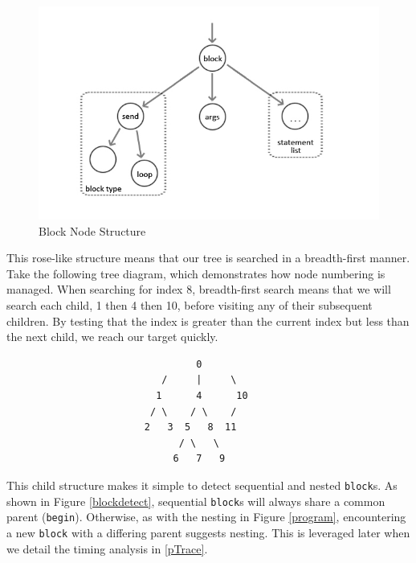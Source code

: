 \documentclass[11pt, abstracton, twoside, titlepage=true]{scrartcl}
\begin{document}
\begin{figure}[h!]
	\centering
	\includegraphics[width=\textwidth]{images/Block.jpg}
	\caption{Block Node Structure} \label{blocks}
\end{figure}

This rose-like structure means that our tree is searched in a breadth-first manner. 
Take the following tree diagram, which demonstrates how node numbering is managed. 
When searching for index 8, breadth-first search means that we will search each 
child, 1 then 4 then 10, before visiting any of their subsequent children. By 
testing that the index is greater than the current index but less than the next child, 
we reach our target quickly.
\\
\begin{lstlisting}
                                 0
                           /     |     \
                          1      4      10
                         / \    / \    / 
                        2   3  5   8  11 
                              / \   \
                             6   7   9
\end{lstlisting} 

This child structure makes it simple to detect sequential and nested \texttt{block}s. 
As shown in Figure \ref{blockdetect}, sequential \texttt{block}s will always share a 
common parent (\texttt{begin}). Otherwise, as with the nesting in Figure \ref{program}, 
encountering a new \texttt{block} with a differing parent suggests nesting. This is 
leveraged later when we detail the timing analysis in \ref{pTrace}.
\end{document}
